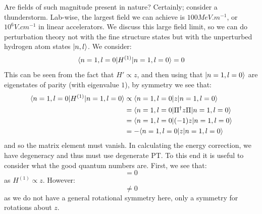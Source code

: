 Are fields of such magnitude present in nature? Certainly; consider a thunderstorm. Lab-wise, the largest field we can achieve is $100\si{MeV.m^{-1}}$, or $10^{6}\si{V.cm^{-1}}$ in linear accelerators. We discuss this large field limit, so we can do perturbation theory not with the fine structure states but with the unperturbed hydrogen atom states $\lvert n, l \rangle$. We consider:
\begin{equation}
    \langle n=1, l=0 \rvert H^{(1)}\lvert n=1,l=0 \rangle = 0
\end{equation}
This can be seen from the fact that $H' \propto z$, and then using that $\lvert n=1, l=0 \rangle$ are eigenstates of parity (with eigenvalue $1$), by symmetry we see that:
\begin{equation}\label{eq-paritymatelezero}
    \begin{split}
        \langle n=1, l=0 \rvert H^{(1)}\lvert n=1, l=0 \rangle &\propto \langle n=1, l=0 \rvert z\lvert n=1, l=0 \rangle 
        \\ &= \langle n=1, l=0 \rvert\Pi^\dagger z \Pi \lvert n=1, l=0 \rangle 
        \\ &= \langle n=1, l=0 \rvert(-1)z \lvert n=1, l=0 \rangle 
        \\ &= -\langle n=1, l=0 \rvert z\lvert n=1, l=0 \rangle
    \end{split}
\end{equation}
and so the matrix element must vanish. In calculating the energy correction, we have degeneracy and thus must use degenerate PT. To this end it is useful to consider what the good quantum numbers are. First, we see that:
\begin{equation}
    [L_z, H^{(1)}] = 0
\end{equation}
as $H^{(1)} \propto z$. However:
\begin{equation}
    [\v{L}^2, H^{(1)}] \neq 0
\end{equation}
as we do not have a general rotational symmetry here, only a symmetry for rotations about $z$.


